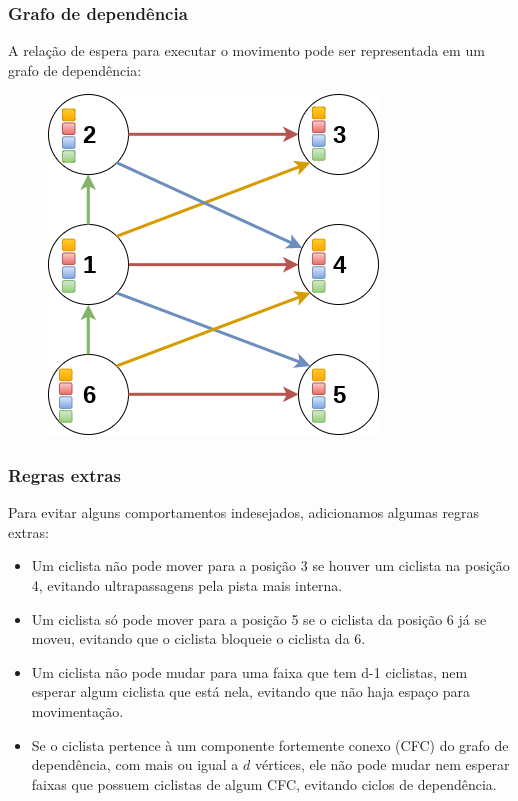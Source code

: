 \documentclass{beamer}
\begin{document}
\begin{frame}
\frametitle{Grafo de dependência}
A relação de espera para executar o movimento pode ser representada em um grafo de dependência:
\begin{figure}
\includegraphics[scale=0.4]{dependency.png}
\end{figure}
\end{frame}


\begin{frame}
\frametitle{Regras extras}
Para evitar alguns comportamentos indesejados, adicionamos algumas regras extras:
\begin{itemize}
\item Um ciclista não pode mover para a posição 3 se houver um ciclista na posição 4, evitando ultrapassagens pela pista mais interna.
\item Um ciclista só pode mover para a posição 5 se o ciclista da posição 6 já se moveu, evitando que o ciclista bloqueie o ciclista da 6.
\item Um ciclista não pode mudar para uma faixa que tem d-1 ciclistas, nem esperar algum ciclista que está nela, evitando que não haja espaço para movimentação.
\item Se o ciclista pertence à um componente fortemente conexo (CFC) do grafo de dependência, com mais ou igual a $d$ vértices, ele não pode mudar nem esperar faixas que possuem ciclistas de algum CFC, evitando ciclos de dependência.
\end{itemize}
\end{frame}
\end{document}
